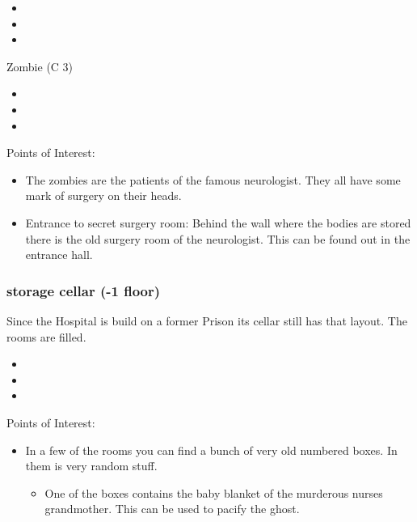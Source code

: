 \documentclass[11pt]{article}
\begin{document}
{\begin{itemize}
\item {}
\item {}
\item {}
\end{itemize}

Zombie (C 3)
\begin{itemize}
\item {}
\item {}
\item {}
\end{itemize}

Points of Interest:
\begin{itemize}
\item The zombies are the patients of the famous neurologist. They all have some mark of surgery on their heads.
\item Entrance to secret surgery room: Behind the wall where the bodies are stored there is the old surgery room of the neurologist. This can be found out in the entrance hall.
\end{itemize}
\subsubsection{storage cellar (-1 floor)}
\label{sec:org05b8bd5}
Since the Hospital is build on a former Prison its cellar still has that layout. The rooms are filled.

\begin{itemize}
\item {}
\item {}
\item {}
\end{itemize}

Points of Interest:
\begin{itemize}
\item In a few of the rooms you can find a bunch of very old numbered boxes. In them is very random stuff.
\begin{itemize}
\item One of the boxes contains the baby blanket of the murderous nurses grandmother. This can be used to pacify the ghost.
\end{itemize}
\end{itemize}


}
\end{document}
